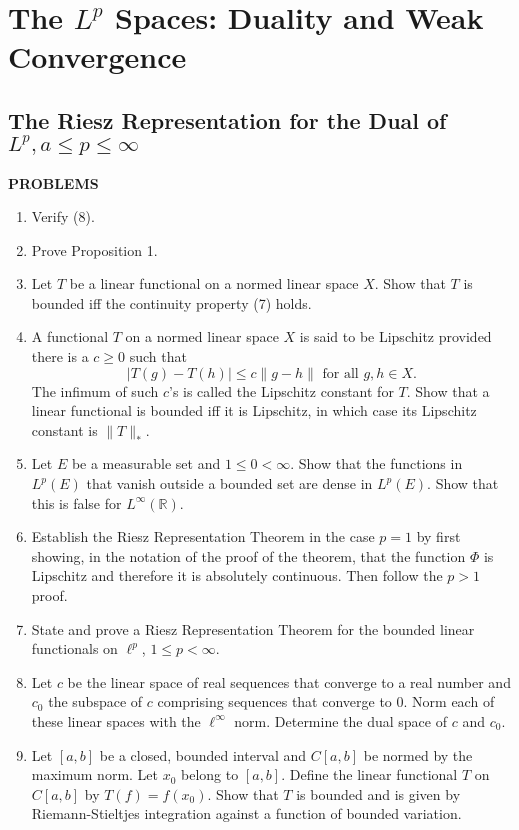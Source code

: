 \chapter{The $L^p$ Spaces: Duality and Weak Convergence}

\section{The Riesz Representation for the Dual of $L^p,a\le p\le \infty$}
\begin{center}
	\textbf{PROBLEMS}
\end{center}
\begin{enumerate}
	\setcounter{enumi}{0}
    \item Verify (8).
    \item Prove Proposition 1.
    \item Let $T$ be a linear functional on a normed linear space $X$. Show that $T$ is bounded iff the continuity property (7) holds.
    \item A functional $T$ on a normed linear space $X$ is said to be Lipschitz provided there is a $c\ge0$ such that
    \[
        |T(g)-T(h)|\le c\|g-h\|\text{ for all }g,h\in X.  
    \]
    The infimum of such $c$'s is called the Lipschitz constant for $T$. Show that a linear functional is bounded iff it is Lipschitz, in which case its Lipschitz constant is $\|T\|_*$.
    \item Let $E$ be a measurable set and $1\le 0<\infty$. Show that the functions in $L^p(E)$ that vanish outside a bounded set are dense in $L^p(E)$. Show that this is false for $L^\infty(\mathbb{R})$.
    \item Establish the Riesz Representation Theorem in the case $p=1$ by first showing, in the notation of the proof of the theorem, that the function $\Phi$ is Lipschitz and therefore it is absolutely continuous. Then follow the $p>1$ proof.
    \item State and prove a Riesz Representation Theorem for the bounded linear functionals on $\ell^p$, $1\le p<\infty$.
    \item Let $c$ be the linear space of real sequences that converge to a real number and $c_0$ the subspace of $c$ comprising sequences that converge to $0$. Norm each of these linear spaces with the $\ell^\infty$ norm. Determine the dual space of $c$ and $c_0$.
    \item Let $[a,b]$ be a closed, bounded interval and $C[a,b]$ be normed by the maximum norm. Let $x_0$ belong to $[a,b]$. Define the linear functional $T$ on $C[a,b]$ by $T(f)=f(x_0)$. Show that $T$ is bounded and is given by Riemann-Stieltjes integration against a function of bounded variation.

\end{enumerate}
